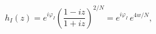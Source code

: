 \begin{equation}
h_I(z)=e^{i\varphi_I}\left(\frac{1-iz}{1+iz}\right)^{2/N}=
e^{i\varphi_I}\,e^{4w/N},
\label{h}
\end{equation}

